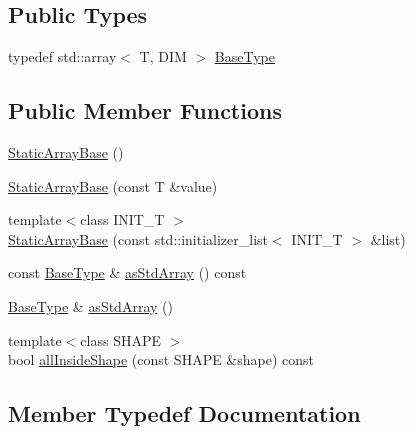 \subsection*{Public Types}
\begin{DoxyCompactItemize}
\item 
typedef std\+::array$<$ T, D\+IM $>$ \hyperlink{classnifty_1_1array_1_1StaticArrayBase_a3f376d2a24fad3a47021c36657494759}{Base\+Type}
\end{DoxyCompactItemize}
\subsection*{Public Member Functions}
\begin{DoxyCompactItemize}
\item 
\hyperlink{classnifty_1_1array_1_1StaticArrayBase_ab15a9b2d0259a54795ffc5aac8d62e50}{Static\+Array\+Base} ()
\item 
\hyperlink{classnifty_1_1array_1_1StaticArrayBase_aa798253fef388d6c0d0fd3d436784e79}{Static\+Array\+Base} (const T \&value)
\item 
{\footnotesize template$<$class I\+N\+I\+T\+\_\+T $>$ }\\\hyperlink{classnifty_1_1array_1_1StaticArrayBase_a6d8d83f91ab1ba26d94d9a5915f98bb0}{Static\+Array\+Base} (const std\+::initializer\+\_\+list$<$ I\+N\+I\+T\+\_\+T $>$ \&list)
\item 
const \hyperlink{classnifty_1_1array_1_1StaticArrayBase_a3f376d2a24fad3a47021c36657494759}{Base\+Type} \& \hyperlink{classnifty_1_1array_1_1StaticArrayBase_a88a05591be79803231598c1c32025ac3}{as\+Std\+Array} () const
\item 
\hyperlink{classnifty_1_1array_1_1StaticArrayBase_a3f376d2a24fad3a47021c36657494759}{Base\+Type} \& \hyperlink{classnifty_1_1array_1_1StaticArrayBase_a205328f2e3ad922e007afe0f9f3e819b}{as\+Std\+Array} ()
\item 
{\footnotesize template$<$class S\+H\+A\+PE $>$ }\\bool \hyperlink{classnifty_1_1array_1_1StaticArrayBase_ae9258cc672d2873aadc346d7c0cc0911}{all\+Inside\+Shape} (const S\+H\+A\+PE \&shape) const
\end{DoxyCompactItemize}


\subsection{Member Typedef Documentation}
\mbox{\label{classnifty_1_1array_1_1StaticArrayBase_a3f376d2a24fad3a47021c36657494759}} 
